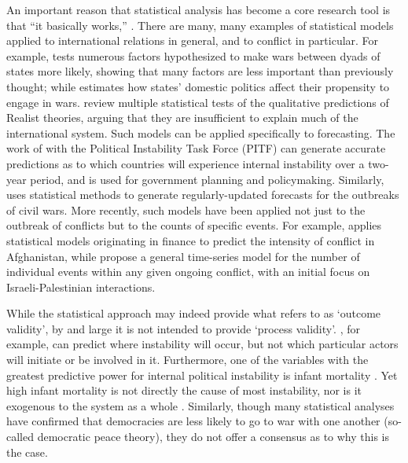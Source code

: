 An important reason that statistical analysis has become a core research tool is that ``it basically works,'' \citep{schrodt_2004}. There are many, many examples of statistical models applied to international relations in general, and to conflict in particular. For example, \citet{bremer_1992} tests numerous factors hypothesized to make wars between dyads of states more likely, showing that many factors are less important than previously thought; while \citet{hagan_1994} estimates how states' domestic politics affect their propensity to engage in wars. \citet{wayman_1994} review multiple statistical tests of the qualitative predictions of Realist theories, arguing that they are insufficient to explain much of the international system. Such models can be applied specifically to forecasting. The work of \citet{goldstone_2005} with the Political Instability Task Force (PITF) can generate accurate predictions as to which countries will experience internal instability over a two-year period, and is used for government planning and policymaking. Similarly, \citet{ward_2013} uses statistical methods to generate regularly-updated forecasts for the outbreaks of civil wars. More recently, such models have been applied not just to the outbreak of conflicts but to the counts of specific events. For example, \citet{yonamine_2013} applies statistical models originating in finance to predict the intensity of conflict in Afghanistan, while \citet{brandt_2011} propose a general time-series model for the number of individual events within any given ongoing conflict, with an initial focus on Israeli-Palestinian interactions.
 
While the statistical approach may indeed provide what \citet{schrodt_2004} refers to as `outcome validity', by and large it is not intended to provide `process validity'. \citet{goldstone_2005}, for example, can predict where instability will occur, but not which particular actors will initiate or be involved in it. Furthermore, one of the variables with the greatest predictive power for internal political instability is infant mortality \citep{goldstone_2005}. Yet high infant mortality is not directly the cause of most instability, nor is it exogenous to the system as a whole \citep{marshall_2008}. Similarly, though many statistical analyses \citep[e.g.][]{maoz_1989,thompson_1997,gartzke_2007} have confirmed that democracies are less likely to go to war with one another (so-called democratic peace theory), they do not offer a consensus as to why this is the case.

